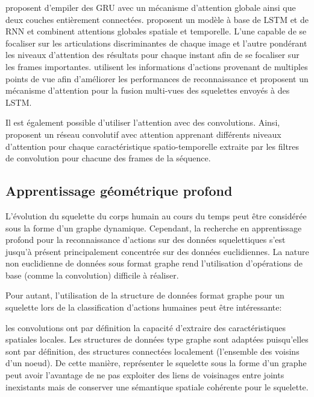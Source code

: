 
\cite{maghoumi2019deepgru} proposent d'empiler des GRU avec un mécanisme d'attention globale ainsi que deux couches entièrement connectées. \cite{song2017end} proposent un modèle à base de LSTM et de RNN et combinent attentions globales spatiale et temporelle. L'une capable de se focaliser sur les articulations discriminantes de chaque image et  l'autre pondérant les niveaux d'attention des résultats pour chaque instant afin de se focaliser sur les frames importantes. \cite{Fan2019AttentionBasedMR} utilisent les informations d'actions provenant de multiples points de vue afin d'améliorer les performances de reconnaissance et proposent un mécanisme d'attention pour la fusion multi-vues des squelettes envoyés à des LSTM. 

Il est également possible d'utiliser l'attention avec des convolutions.
Ainsi, \cite{hou2018spatial} proposent un réseau convolutif avec attention apprenant différents niveaux d'attention pour chaque caractéristique spatio-temporelle extraite par les filtres de convolution pour chacune des  frames de la séquence.

\subsection{Apprentissage géométrique profond}
L'évolution du squelette du corps humain au cours du temps peut être considérée sous la forme d'un graphe dynamique. Cependant, la recherche en apprentissage profond pour la reconnaissance d'actions sur des données squelettiques s'est jusqu'à présent principalement concentrée sur des données euclidiennes.
La nature non euclidienne de données sous format graphe rend l'utilisation d'opérations de base (comme la convolution) difficile à réaliser. 

Pour autant, l'utilisation de la structure de données format graphe pour un squelette lors de la classification d'actions humaines peut être intéressante:

les convolutions ont par définition la capacité d'extraire des caractéristiques spatiales locales. Les structures de données type graphe sont adaptées puisqu'elles sont par définition, des structures connectées localement (l’ensemble des voisins d’un noeud). De cette manière, représenter le squelette sous la forme d'un graphe peut avoir l'avantage de ne pas exploiter des liens de voisinages entre joints inexistants mais de conserver une sémantique spatiale cohérente pour le squelette.

